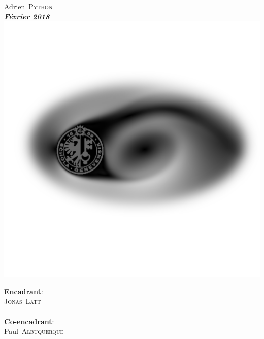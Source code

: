 \begin{titlepage}
\begin{center}
\large Adrien~\textsc{Python}\\[0.7cm]
\textbf{\textit{Février 2018}}
\\[0.9cm]
\includegraphics[scale=0.4, trim= 50 230 0 200, clip]{images/title_sim.pdf}

\vfill

\begin{flushleft} 
\textbf{Encadrant}:\\
\textsc{Jonas~Latt}\\
~\\
\textbf{Co-encadrant}:\\
Paul~\textsc{Albuquerque}
\end{flushleft}



\end{center}

\end{titlepage}